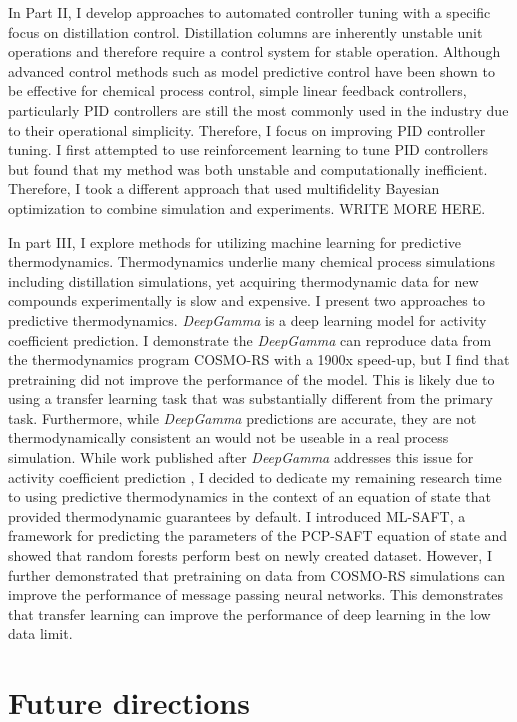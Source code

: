 In Part II, I develop approaches to automated controller tuning with a specific focus on distillation control. Distillation columns are inherently unstable unit operations and therefore require a control system for stable operation. Although advanced control methods such as model predictive control have been shown to be effective for chemical process control, simple linear feedback controllers, particularly PID controllers are still the most commonly used in the industry due to their operational simplicity. Therefore, I focus on improving PID controller tuning. I first attempted to use reinforcement learning to tune PID controllers but found that my method was both unstable and computationally inefficient. Therefore, I took a different approach that used multifidelity Bayesian optimization to combine simulation and experiments.  WRITE MORE HERE.

In part III, I explore methods for utilizing machine learning for predictive thermodynamics. Thermodynamics underlie many chemical process simulations including distillation simulations, yet acquiring thermodynamic data for new compounds experimentally is slow and expensive. I present two approaches to predictive thermodynamics. \textit{DeepGamma} is a deep learning model for activity coefficient prediction. I demonstrate the \textit{DeepGamma} can reproduce data from the thermodynamics program COSMO-RS with a 1900x speed-up, but I find that pretraining  did not improve the performance of the model. This is likely due to using a transfer learning task that was substantially different from the primary task. Furthermore, while \textit{DeepGamma} predictions are accurate, they are not thermodynamically consistent an would not be useable in a real process simulation. While work published after \textit{DeepGamma} addresses this issue for activity coefficient prediction \cite{Winter2022, SanchezMedina2023}, I decided to dedicate my remaining research time to using predictive thermodynamics in the context of an equation of state that provided thermodynamic guarantees by default. I introduced ML-SAFT, a framework for predicting the parameters of the PCP-SAFT equation of state and showed that random forests perform best on newly created dataset. However, I further demonstrated that pretraining on data from COSMO-RS simulations can improve the performance of message passing neural networks. This demonstrates that transfer learning can improve the performance of deep learning in the low data limit.

\section{Future directions}

